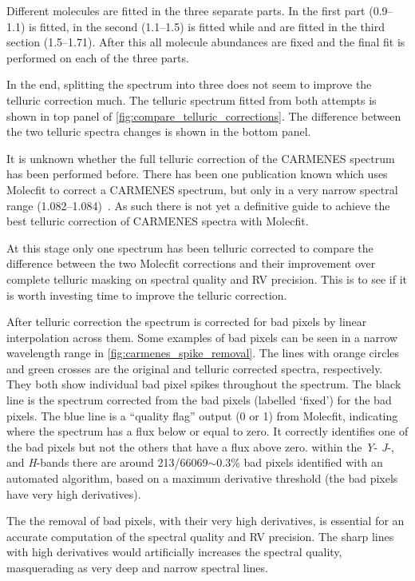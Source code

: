 Different molecules are fitted in the three separate parts.
In the first part (0.9--1.1\um{})  is fitted, in the second (1.1--1.5\um{})  is fitted while  and  are fitted in the third section (1.5--1.71\um{}).
After this all molecule abundances are fixed and the final fit is performed on each of the three parts.

In the end, splitting the spectrum into three does not seem to improve the telluric correction much.
The telluric spectrum fitted from both attempts is shown in top panel of \cref{fig:compare_telluric_corrections}.
The difference between the two telluric spectra changes is shown in the bottom panel.

It is unknown whether the full telluric correction of the {CARMENES} \nir{} spectrum has been performed before.
There has been one publication known which uses {Molecfit} to correct a {CARMENES} spectrum, but only in a very narrow spectral range (1.082--1.084\um{})~\citep{allart_spectrally_2018}.
As such there is not yet a definitive guide to achieve the best telluric correction of {CARMENES} spectra with {Molecfit}.

At this stage only one spectrum has been telluric corrected to compare the difference between the two {Molecfit} corrections and their improvement over complete telluric masking on spectral quality and {RV} precision.
This is to see if it is worth investing time to improve the telluric correction.

After telluric correction the spectrum is corrected for bad pixels by linear interpolation across them.
Some examples of bad pixels can be seen in a narrow wavelength range in \cref{fig:carmenes_spike_removal}.
The lines with orange circles and green crosses are the original and telluric corrected spectra, respectively.
They both show individual bad pixel spikes throughout the spectrum.
The black line is the spectrum corrected from the bad pixels (labelled `fixed') for the bad pixels. 
The blue line is a ``quality flag'' output (0 or 1) from {Molecfit}, indicating where the spectrum has a flux below or equal to zero.
It correctly identifies one of the bad pixels but not the others that have a flux above zero.
within the \emph{Y}- \emph{J}-, and \emph{H}-bands there are around 213/66069\(\sim\)0.3\% bad pixels identified with an automated algorithm, based on a maximum derivative threshold (the bad pixels have very high derivatives).

The the removal of bad pixels, with their very high derivatives, is essential for an accurate computation of the spectral quality and RV precision. The sharp lines with high derivatives would artificially increases the spectral quality, masquerading as very deep and narrow spectral lines.


